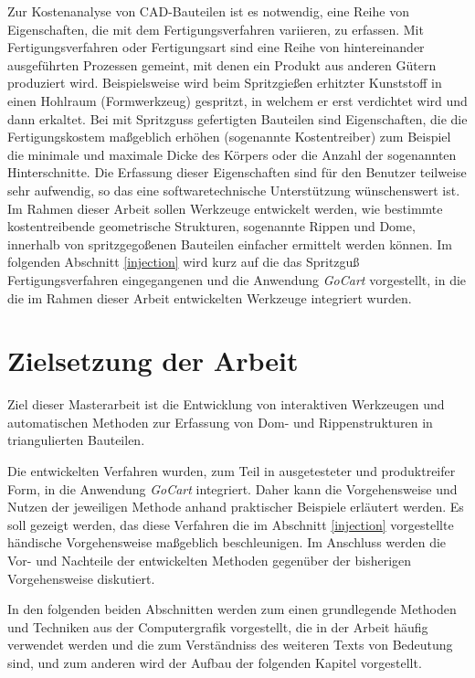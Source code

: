 Zur Kostenanalyse von CAD-Bauteilen ist es notwendig, eine Reihe von Eigenschaften, die mit dem Fertigungsverfahren variieren, zu erfassen. Mit Fertigungsverfahren oder Fertigungsart sind eine Reihe von hintereinander ausgef\"uhrten Prozessen gemeint, mit denen ein Produkt aus anderen G\"utern produziert wird. Beispielsweise wird beim Spritzgie{\ss}en erhitzter Kunststoff in einen Hohlraum (Formwerkzeug) gespritzt, in welchem er erst verdichtet wird und dann erkaltet. Bei mit Spritzguss gefertigten Bauteilen sind Eigenschaften, die die Fertigungskostem ma{\ss}geblich erh\"ohen (sogenannte Kostentreiber) zum Beispiel die minimale und maximale Dicke des K\"orpers oder die Anzahl der sogenannten Hinterschnitte. Die Erfassung dieser Eigenschaften sind f\"ur den Benutzer teilweise sehr aufwendig, so das eine softwaretechnische Unterst\"utzung w\"unschenswert ist. Im Rahmen dieser Arbeit sollen Werkzeuge entwickelt werden, wie bestimmte kostentreibende geometrische Strukturen, sogenannte Rippen und Dome, innerhalb von spritzgego{\ss}enen Bauteilen einfacher ermittelt werden k\"onnen. Im folgenden Abschnitt \ref{injection} wird kurz auf die das Spritzgu{\ss} Fertigungsverfahren eingegangenen und die Anwendung \textit{GoCart} vorgestellt, in die die im Rahmen dieser Arbeit entwickelten Werkzeuge integriert wurden.
 
\newpage
 




\section{Zielsetzung der Arbeit}
\label{problem}

Ziel dieser Masterarbeit ist die Entwicklung von interaktiven Werkzeugen und automatischen Methoden zur Erfassung von Dom- und Rippenstrukturen in triangulierten Bauteilen.

Die entwickelten Verfahren wurden, zum Teil in ausgetesteter und produktreifer Form, in die Anwendung \textit{GoCart} integriert. Daher kann die Vorgehensweise und Nutzen der jeweiligen Methode anhand praktischer Beispiele erl\"autert werden. Es soll gezeigt werden, das diese Verfahren die im Abschnitt \ref{injection} vorgestellte h\"andische Vorgehensweise ma{\ss}geblich beschleunigen. Im Anschluss werden die Vor- und Nachteile der entwickelten Methoden gegenüber der bisherigen Vorgehensweise diskutiert.

In den folgenden beiden Abschnitten werden zum einen grundlegende Methoden und Techniken aus der Computergrafik vorgestellt, die in der Arbeit h\"aufig verwendet werden und die zum Verst\"andniss des weiteren Texts von Bedeutung sind, und zum anderen wird der Aufbau der folgenden Kapitel vorgestellt.

